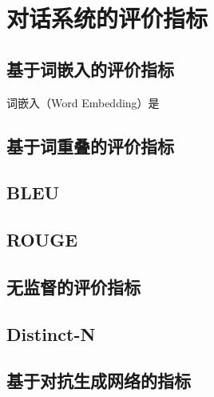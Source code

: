 \section{对话系统的评价指标}

\subsection{基于词嵌入的评价指标}
词嵌入（Word Embedding）是

\subsection{基于词重叠的评价指标}
\subsection{BLEU}

\subsection{ROUGE}

\subsection{无监督的评价指标}
\subsection{Distinct-N}

\subsection{基于对抗生成网络的指标}

